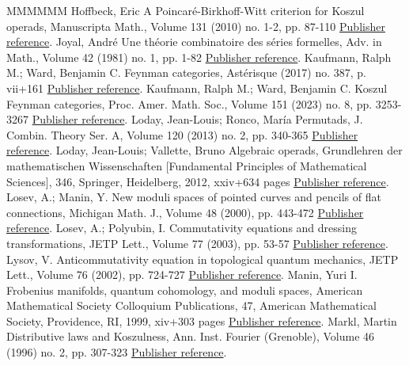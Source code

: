 \begin{thebibliography}{MMMMMM}
 Hoffbeck, Eric A Poincaré-Birkhoff-Witt criterion for Koszul operads, Manuscripta Math., Volume 131 (2010) no. 1-2, pp. 87-110 \href{https://alco.centre-mersenne.org/articles/10.5802/alco.347/#MR2574993}{Publisher reference}.
 Joyal, André Une théorie combinatoire des séries formelles, Adv. in Math., Volume 42 (1981) no. 1, pp. 1-82 \href{https://alco.centre-mersenne.org/articles/10.5802/alco.347/#MR633783}{Publisher reference}.
 Kaufmann, Ralph M.; Ward, Benjamin C. Feynman categories, Astérisque (2017) no. 387, p. vii+161 \href{https://alco.centre-mersenne.org/articles/10.5802/alco.347/#MR3636409}{Publisher reference}.
 Kaufmann, Ralph M.; Ward, Benjamin C. Koszul Feynman categories, Proc. Amer. Math. Soc., Volume 151 (2023) no. 8, pp. 3253-3267 \href{https://alco.centre-mersenne.org/articles/10.5802/alco.347/#KWKoszul}{Publisher reference}.
 Loday, Jean-Louis; Ronco, María Permutads, J. Combin. Theory Ser. A, Volume 120 (2013) no. 2, pp. 340-365 \href{https://alco.centre-mersenne.org/articles/10.5802/alco.347/#MR2995045}{Publisher reference}.
 Loday, Jean-Louis; Vallette, Bruno Algebraic operads, Grundlehren der mathematischen Wissenschaften [Fundamental Principles of Mathematical Sciences], 346, Springer, Heidelberg, 2012, xxiv+634 pages \href{https://alco.centre-mersenne.org/articles/10.5802/alco.347/#MR2954392}{Publisher reference}.
 Losev, A.; Manin, Y. New moduli spaces of pointed curves and pencils of flat connections, Michigan Math. J., Volume 48 (2000), pp. 443-472 \href{https://alco.centre-mersenne.org/articles/10.5802/alco.347/#MR1786500}{Publisher reference}.
 Losev, A.; Polyubin, I. Commutativity equations and dressing transformations, JETP Lett., Volume 77 (2003), pp. 53-57 \href{https://alco.centre-mersenne.org/articles/10.5802/alco.347/#LosevPolyubin}{Publisher reference}.
 Lysov, V. Anticommutativity equation in topological quantum mechanics, JETP Lett., Volume 76 (2002), pp. 724-727 \href{https://alco.centre-mersenne.org/articles/10.5802/alco.347/#Lysov}{Publisher reference}.
 Manin, Yuri I. Frobenius manifolds, quantum cohomology, and moduli spaces, American Mathematical Society Colloquium Publications, 47, American Mathematical Society, Providence, RI, 1999, xiv+303 pages \href{https://alco.centre-mersenne.org/articles/10.5802/alco.347/#MR1702284}{Publisher reference}.
 Markl, Martin Distributive laws and Koszulness, Ann. Inst. Fourier (Grenoble), Volume 46 (1996) no. 2, pp. 307-323 \href{https://alco.centre-mersenne.org/articles/10.5802/alco.347/#MR1393517}{Publisher reference}.

\end{thebibliography}
